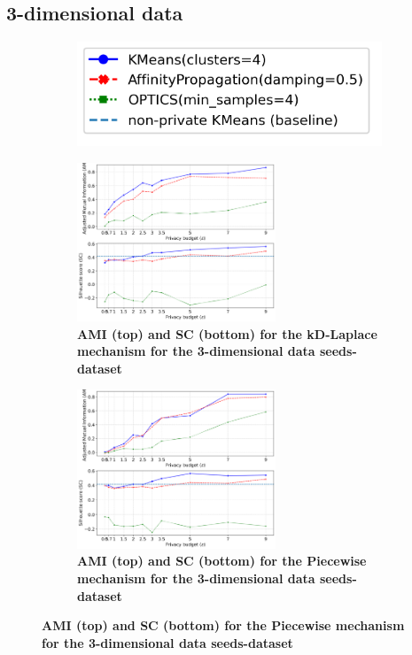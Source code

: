 \subsection{3-dimensional data}
\begin{figure}[H]
    \centering
    \begin{subfigure}{0.30\textwidth}
        \includegraphics[width=\textwidth]{Results/2d-laplace/seeds-dataset/legend.png}
    \end{subfigure}
    \begin{subfigure}{1\textwidth}
        \caption{\textbf{AMI (top) and SC (bottom) for the kD-Laplace mechanism for the 3-dimensional data seeds-dataset}}
        \centering
        \includegraphics[width=0.65\textwidth]{Results/kd-laplace/kd-Laplace/seeds-dataset/ami-and-sc_3_dimensions.png}
        \centering
    \end{subfigure}
    \begin{subfigure}{1\textwidth}
        \caption{\textbf{AMI (top) and SC (bottom) for the Piecewise mechanism for the 3-dimensional data seeds-dataset}}
        \centering
        \includegraphics[width=0.65\textwidth]{Results/kd-laplace/piecewise/seeds-dataset/ami-and-sc_3_dimensions.png}
    \end{subfigure}
    \label{fig:validation-seeds-dataset_comparison_3d-laplace}
\end{figure}

